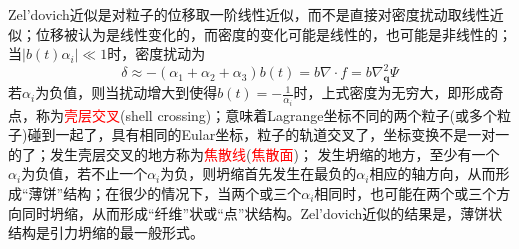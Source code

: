 \documentclass[12pt,a4paper]{article}
\renewcommand{\vec}[1]{\boldsymbol{#1}}
\begin{document}
Zel'dovich近似是对粒子的位移取一阶线性近似，而不是直接对密度扰动取线性近似；位移被认为是线性变化的，而密度的变化可能是线性的，也可能是非线性的；
当$|b(t) \alpha_i| \ll 1$时，密度扰动为
\begin{equation}
\delta \approx -(\alpha_1+\alpha_2+\alpha_3) b(t) = b \nabla\cdot f = b \nabla^2_{\vec{q}} \Psi
\end{equation}
若$\alpha_i$为负值，则当扰动增大到使得$b(t) = -\frac{1}{\alpha_i}$时，上式密度为无穷大，即形成奇点，称为\textcolor{red}{壳层交叉}(shell crossing)；意味着Lagrange坐标不同的两个粒子(或多个粒子)碰到一起了，具有相同的Eular坐标，粒子的轨道交叉了，坐标变换不是一对一的了；发生壳层交叉的地方称为\textcolor{red}{焦散线}(\textcolor{red}{焦散面})；
发生坍缩的地方，至少有一个$\alpha_i$为负值，若不止一个$\alpha_i$为负，则坍缩首先发生在最负的$\alpha_i$相应的轴方向，从而形成“薄饼”结构；在很少的情况下，当两个或三个$\alpha_i$相同时，也可能在两个或三个方向同时坍缩，从而形成“纤维”状或“点”状结构。Zel'dovich近似的结果是，薄饼状结构是引力坍缩的最一般形式。


























\end{document}
